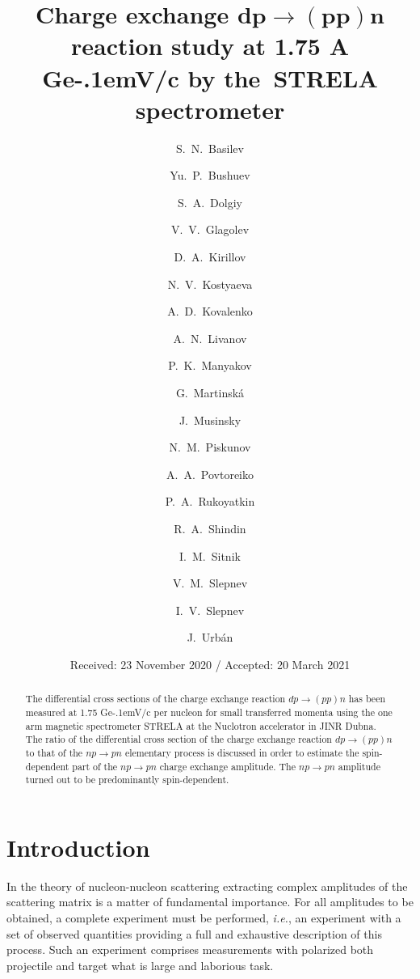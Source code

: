 \documentclass[twocolumn,epjc3]{svjour3}
\newcommand{\np}     {\ensuremath{np \rightarrow pn}\xspace}
\newcommand{\dpchex} {\ensuremath{dp \rightarrow (pp)n}\xspace}
\newcommand{\GeVc}   {Ge\kern-.1emV/c\xspace}
\begin{document}
\title{Charge exchange
  $\boldsymbol{{\dpchex}}$ %
  reaction study at 1.75 A \GeVc by the~STRELA spectrometer}

\author{\raggedright
  S.~N.~Basilev    \and Yu.~P.~Bushuev   \and
  S.~A.~Dolgiy     \and V.~V.~Glagolev   \and
  D.~A.~Kirillov   \and N.~V.~Kostyaeva  \and
  A.~D.~Kovalenko  \and A.~N.~Livanov    \and
  P.~K.~Manyakov   \and G.~Martinsk\'{a} \and
  J.~Musinsky  \and N.~M.~Piskunov   \and
  A.~A.~Povtoreiko \and P.~A.~Rukoyatkin \and
  R.~A.~Shindin    \and I.~M.~Sitnik     \and
  V.~M.~Slepnev    \and I.~V.~Slepnev    \and
  J.~Urb\'{a}n
}


\date{Received: 23 November 2020 / Accepted: 20 March 2021}
\maketitle

\begin{abstract}
  The differential cross sections of the charge exchange reaction \dpchex has
  been measured at 1.75 \GeVc per nucleon for small transferred momenta using
  the one arm magnetic spectrometer STRELA at the Nuclotron accelerator in JINR
  Dubna. The ratio of the differential cross section of the charge exchange
  reaction \dpchex to that of the \np elementary process is discussed in order
  to estimate the spin-dependent part of the \np charge exchange amplitude. The
  \np amplitude turned out to be predominantly spin-dependent.
\end{abstract}

\section{Introduction}
In the theory of nucleon-nucleon scattering extracting complex amplitudes of the
scattering matrix is a matter of fundamental importance. For all amplitudes to
be obtained, a complete experiment must be performed, \textit{i.e.}, an
experiment with a set of observed quantities providing a full and exhaustive
description of this process. Such an experiment comprises measurements with
polarized both projectile and target what is large and laborious task.
\end{document}
